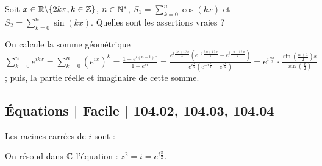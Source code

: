 \begin{question} 

Soit $x\in \mathbb{R}\backslash \{2k\pi, k \in \mathbb{Z}\}$, $n \in \mathbb{N}^*$, 
$S_1= \sum_{k=0}^{n} \cos(kx)$ et $S_2= \sum_{k=0}^{n} \sin(kx)$. Quelles sont les assertions vraies ?
\begin{answers}
    
    
    
    
    
    

\end{answers}
\begin{explanations}
On calcule la somme géométrique $\sum_{k=0}^{n} e^{ikx}= \sum_{k=0}^{n} (e^{ix})^k = \frac{1-e^{i(n+1)x}}{1-e^{ix}}=\frac{e^{i\frac{(n+1)x}{2}}(e^{-i\frac{(n+1)x}{2}}-e^{i\frac{(n+1)x}{2}})}{e^{i\frac{x}{2}}(e^{-i\frac{x}{2}}-e^{i\frac{x}{2}})}= e^{i\frac{nx}{2}}\cdot  \frac{\sin (\frac{n+1}{2})x}{\sin (\frac{x}{2})}$; puis, la partie réelle
et imaginaire de cette somme.
\end{explanations}

\end{question}

\subsection{Équations | Facile | 104.02, 104.03, 104.04}




\begin{question}

Les racines carrées de $i$ sont : 
\begin{answers}


\end{answers}
\begin{explanations}
On résoud dans $\mathbb{C}$ l'équation : $z^2=i=e^{i\frac{\pi}{2}}$. 
\end{explanations}

\end{question}


